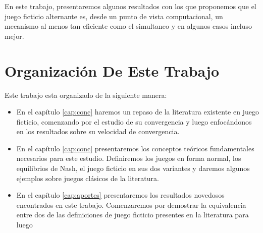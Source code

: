 En este trabajo, presentaremos algunos resultados con los que proponemos que el juego ficticio alternante es, desde un punto de vista computacional, un mecanismo al menos tan eficiente como el simultaneo y en algunos casos incluso mejor. 


\section{Organización De Este Trabajo}

Este trabajo esta organizado de la siguiente manera:
\begin{itemize}
  \item En el capítulo \ref{cap:conc} haremos un repaso de la literatura existente en juego ficticio, comenzando por el estudio de su convergencia y luego enfocándonos en los resultados sobre su velocidad de convergencia. 
  \item En el capítulo \ref{cap:conc} presentaremos los conceptos teóricos fundamentales necesarios para este estudio. Definiremos los juegos en forma normal, los equilibrios de Nash, el juego ficticio en sus dos variantes y daremos algunos ejemplos sobre juegos clásicos de la literatura.
  \item En el capítulo \ref{cap:aportes} presentaremos los resultados novedosos encontrados en este trabajo. Comenzaremos por demostrar la equivalencia entre dos de las definiciones de juego ficticio presentes en la literatura para luego  
\end{itemize}






